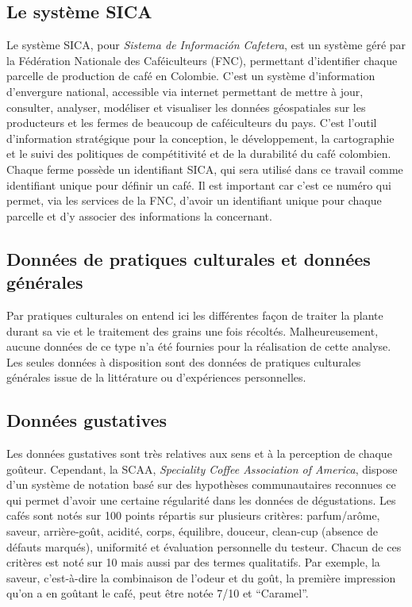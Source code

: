 \subsection{Le système SICA}Le système SICA, pour \textit{Sistema de Información Cafetera}, est un système géré par la Fédération Nationale des Caféiculteurs (FNC), permettant d'identifier chaque parcelle de production de café en Colombie. C'est un système d'information d'envergure national, accessible via internet permettant de mettre à jour, consulter, analyser, modéliser et visualiser les données géospatiales sur les producteurs et les fermes de beaucoup de caféiculteurs du pays. C'est l'outil d'information stratégique pour la conception, le développement, la cartographie et le suivi des politiques de compétitivité et de la durabilité du café colombien\cite{SICA}. Chaque ferme possède un identifiant SICA, qui sera utilisé dans ce travail comme identifiant unique pour définir un café. Il est important car c'est ce numéro qui permet, via les services de la FNC, d'avoir un identifiant unique pour chaque parcelle et d'y associer des informations la concernant.  

\subsection{Données de pratiques culturales et données générales}
Par pratiques culturales on entend ici les différentes façon de traiter la plante durant sa vie et le traitement des grains une fois récoltés. Malheureusement, aucune données de ce type n'a été fournies pour la réalisation de cette analyse. Les seules données à disposition sont des données de pratiques culturales générales issue de la littérature ou d'expériences personnelles. \cite{CoffeeImport} \cite{CCI} \cite{WikiCafeicultureColombie} \cite{InternationalCoffeeOrganisation} \cite{GuideCafe}

\subsection{Données gustatives}
Les données gustatives sont très relatives aux sens et à la perception de chaque goûteur. Cependant, la SCAA, \textit{Speciality Coffee Association of America}, dispose d’un système de notation \cite{CupingProtocol} basé sur des hypothèses communautaires reconnues ce qui permet d’avoir une certaine régularité dans les données de dégustations. Les cafés sont notés sur 100 points répartis sur plusieurs critères: parfum/arôme, saveur, arrière-goût, acidité, corps, équilibre, douceur, clean-cup (absence de défauts marqués), uniformité et évaluation personnelle du testeur.  Chacun de ces critères est noté sur 10 mais aussi par des termes qualitatifs. Par exemple, la saveur, c’est-à-dire la combinaison de l’odeur et du goût, la première impression qu’on a en goûtant le café, peut être notée 7/10 et “Caramel”. \\

